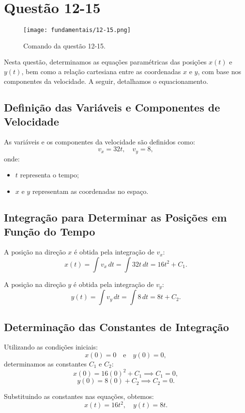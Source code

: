 \newpage
\section{Questão 12-15}


\begin{figure}[H]
	\centering
	\texttt{[image: fundamentais/12-15.png]}
	\caption{Comando da questão 12-15.}\label{fig:q12-15}
\end{figure}


Nesta questão, determinamos as equações paramétricas das posições \(x(t)\) e \(y(t)\), bem como a relação cartesiana entre as coordenadas \(x\) e \(y\), com base nos componentes da velocidade. A seguir, detalhamos o equacionamento.

\subsection*{Definição das Variáveis e Componentes de Velocidade}
As variáveis e os componentes da velocidade são definidos como:
\[
v_x = 32t, \quad v_y = 8,
\]
onde:
\begin{itemize}
    \item \(t\) representa o tempo;
    \item \(x\) e \(y\) representam as coordenadas no espaço.
\end{itemize}

\subsection*{Integração para Determinar as Posições em Função do Tempo}
A posição na direção \(x\) é obtida pela integração de \(v_x\):
\[
x(t) = \int v_x \, dt = \int 32t \, dt = 16t^2 + C_1.
\]

A posição na direção \(y\) é obtida pela integração de \(v_y\):
\[
y(t) = \int v_y \, dt = \int 8 \, dt = 8t + C_2.
\]

\subsection*{Determinação das Constantes de Integração}
Utilizando as condições iniciais:
\[
x(0) = 0 \quad \text{e} \quad y(0) = 0,
\]
determinamos as constantes \(C_1\) e \(C_2\):
\[
x(0) = 16(0)^2 + C_1 \implies C_1 = 0,
\]
\[
y(0) = 8(0) + C_2 \implies C_2 = 0.
\]

Substituindo as constantes nas equações, obtemos:
\[
x(t) = 16t^2, \quad y(t) = 8t.
\]

